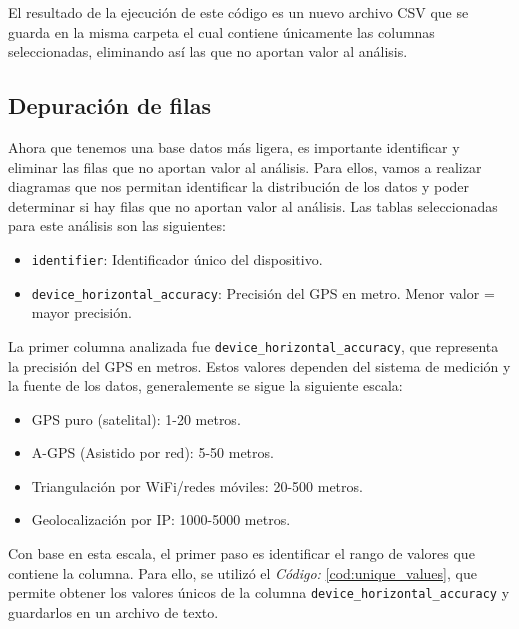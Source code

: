 \noindent El resultado de la ejecución de este código es un nuevo archivo CSV que se guarda en la misma carpeta el cual contiene únicamente las columnas seleccionadas, eliminando así las que no aportan valor al análisis. 

\newpage
\subsection{Depuración de filas}
\label{subsec:depuracion_filas}
\noindent Ahora que tenemos una base datos más ligera, es importante identificar y eliminar las filas que no aportan valor al análisis. Para ellos, vamos a realizar diagramas que nos permitan identificar la distribución de los datos y poder determinar si hay filas que no aportan valor al análisis. Las tablas seleccionadas para este análisis son las siguientes:
\begin{itemize}
    \item \texttt{identifier}: Identificador único del dispositivo.
    \item \texttt{device\_horizontal\_accuracy}: Precisión del GPS en metro. Menor valor = mayor precisión. 
\end{itemize}

\noindent La primer columna analizada fue \texttt{device\_horizontal\_accuracy}, que representa la precisión del GPS en metros. Estos valores dependen del sistema de medición y la fuente de los datos, generalemente se sigue la siguiente escala:
\begin{itemize}
    \item GPS puro (satelital): 1-20 metros.
    \item A-GPS (Asistido por red): 5-50 metros.
    \item Triangulación por WiFi/redes móviles: 20-500 metros.
    \item Geolocalización por IP: 1000-5000 metros.
\end{itemize}

\noindent Con base en esta escala, el primer paso es identificar el rango de valores que contiene la columna. Para ello, se utilizó el \textit{Código:} \ref{cod:unique_values}, que permite obtener los valores únicos de la columna \texttt{device\_horizontal\_accuracy} y guardarlos en un archivo de texto. 

